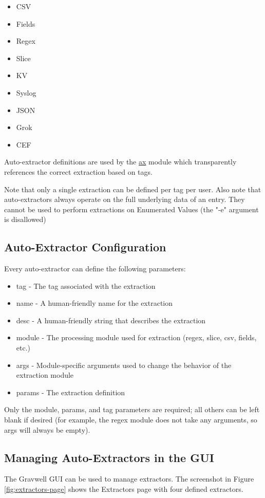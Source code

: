 \begin{itemize}
\tightlist
\item
  CSV
\item
  Fields
\item
  Regex
\item
  Slice
\item
  KV
\item
  Syslog
\item
  JSON
\item
  Grok
\item
  CEF
\end{itemize}

Auto-extractor definitions are used by
the \href{https://docs.gravwell.io/\#!search/ax/ax.md}{ax} module
which transparently references the correct extraction based on tags.

Note that only a single extraction can be defined per tag per user. Also note
that auto-extractors always operate on the full underlying data of an
entry. They cannot be used to perform extractions on Enumerated Values
(the "-e" argument is disallowed)

\subsection{Auto-Extractor Configuration}

Every auto-extractor can define the following parameters:

\begin{itemize}
\item
  tag - The tag associated with the extraction
\item
  name - A human-friendly name for the extraction
\item
  desc - A human-friendly string that describes the extraction
\item
  module - The processing module used for extraction (regex, slice,
  csv, fields, etc.)
\item
  args - Module-specific arguments used to change the behavior of the
  extraction module
\item
  params - The extraction definition
\end{itemize}

Only the module, params, and tag parameters are required;
all others can be left blank if desired (for example, the regex module
does not take any arguments, so args will always be empty).

\subsection{Managing Auto-Extractors in the GUI}
The Gravwell GUI can be used to manage extractors. The screenshot in Figure \ref{fig:extractors-page}
shows the Extractors page with four defined extractors.

